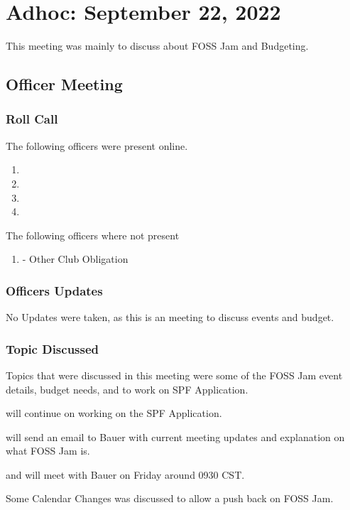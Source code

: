 \section{Adhoc: September 22, 2022}
This meeting was mainly to discuss about FOSS Jam and Budgeting.

\subsection{Officer Meeting}

\subsubsection{Roll Call}
The following officers were present online.

\begin{enumerate}
\item \tresurer
\item \secretary
\item \primaryprogrammer
\item \vicepresident
\end{enumerate}

The following officers where not present

\begin{enumerate}
    \item \president - Other Club Obligation
\end{enumerate}

\subsubsection{Officers Updates}

No Updates were taken, as this is an meeting to discuss events and budget.

\subsubsection{Topic Discussed}

Topics that were discussed in this meeting were some of the FOSS Jam event details, budget needs, and to work on SPF Application.

\tresurer  will continue on working on the SPF Application.

\tresurer  will send an email to Bauer with current meeting updates and explanation on what FOSS Jam is.

\tresurer  and \primaryprogrammer  will meet with Bauer on Friday around 0930 CST.

Some Calendar Changes was discussed to allow a push back on FOSS Jam.
